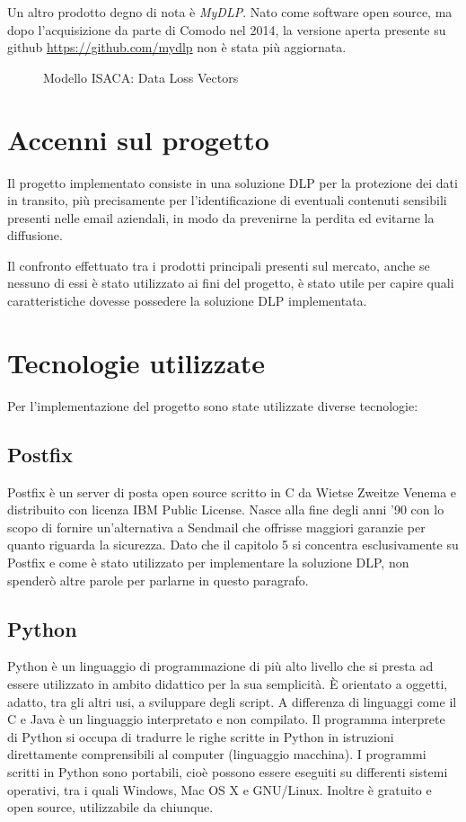     Un altro prodotto degno di nota è \textit{MyDLP}. Nato come software open source,
    ma dopo l'acquisizione da parte di Comodo nel 2014, la versione aperta presente su github
    \url{https://github.com/mydlp} non è stata più aggiornata.

    \begin{figure}
        \centering
        \caption{Modello ISACA: Data Loss Vectors}\label{ModelloIsaca}
      \end{figure}

\section{Accenni sul progetto}
Il progetto implementato consiste in una soluzione DLP per la protezione dei dati in transito, più precisamente per
l'identificazione di eventuali contenuti sensibili presenti nelle email aziendali, in modo da prevenirne la perdita
ed evitarne la diffusione.

Il confronto effettuato tra i prodotti principali presenti sul mercato, anche se nessuno di essi è stato utilizzato 
ai fini del progetto, è stato utile per capire quali caratteristiche dovesse possedere la soluzione DLP implementata.

\section{Tecnologie utilizzate}
Per l'implementazione del progetto sono state utilizzate diverse tecnologie:
    \subsection{Postfix}
    Postfix è un server di posta open source scritto in C da Wietse Zweitze Venema e distribuito con licenza IBM 
    Public License. Nasce alla fine degli anni '90 con lo scopo di fornire un'alternativa a Sendmail che offrisse 
    maggiori garanzie per quanto riguarda la sicurezza.\cite{Postfix1}
    Dato che il capitolo 5 si concentra esclusivamente su Postfix e come è stato utilizzato per implementare la 
    soluzione DLP, non spenderò altre parole per parlarne in questo paragrafo.
    
    \subsection{Python}
    Python è un linguaggio di programmazione di più alto livello che si presta ad essere utilizzato in ambito didattico per la sua semplicità. È orientato a oggetti, adatto, tra gli altri usi, a sviluppare 
    degli script.\cite{Python1} A differenza di linguaggi come il C e Java è un linguaggio interpretato e non compilato. 
    Il programma interprete di Python si occupa di tradurre le righe scritte in Python in istruzioni direttamente 
    comprensibili al computer (linguaggio macchina). I programmi scritti in Python sono portabili, 
    cioè possono essere eseguiti su differenti sistemi operativi, tra i quali Windows, Mac OS X e GNU/Linux. 
    Inoltre è gratuito e open source, utilizzabile da chiunque.\cite{boscaini2017imparare}

